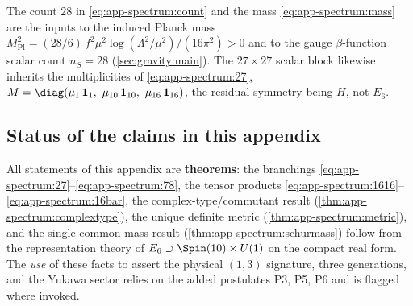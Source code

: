 \begin{remark}\label{rem:app-spectrum:downstream}
The count $28$ in \eqref{eq:app-spectrum:count} and the mass
\eqref{eq:app-spectrum:mass} are the inputs to the induced Planck mass
$M_{\mathrm{Pl}}^2=(28/6)\,f^2\mu^2\log(\Lambda^2/\mu^2)/(16\pi^2)>0$ and
to the gauge $\beta$-function scalar count $n_S=28$
(\autoref{sec:gravity:main}). The $27\times27$ scalar block likewise
inherits the multiplicities of \eqref{eq:app-spectrum:27},
$M=\diag(\mu_1\,\mathbf 1_1,\ \mu_{10}\,\mathbf 1_{10},\
\mu_{16}\,\mathbf 1_{16})$, the residual symmetry being $H$, not $E_6$.
\end{remark}

\subsection*{Status of the claims in this appendix}
\label{sec:app-spectrum:status}

All statements of this appendix are \textbf{theorems}: the branchings
\eqref{eq:app-spectrum:27}--\eqref{eq:app-spectrum:78}, the tensor
products \eqref{eq:app-spectrum:1616}--\eqref{eq:app-spectrum:16bar}, the
complex-type/commutant result (\autoref{thm:app-spectrum:complextype}),
the unique definite metric (\autoref{thm:app-spectrum:metric}), and the
single-common-mass result (\autoref{thm:app-spectrum:schurmass}) follow
from the representation theory of $E_6\supset\Spin(10)\times U(1)$ on the
compact real form. The \emph{use} of these facts to assert the physical
$(1,3)$ signature, three generations, and the Yukawa sector relies on the
added postulates P3, P5, P6 and is flagged where invoked.
